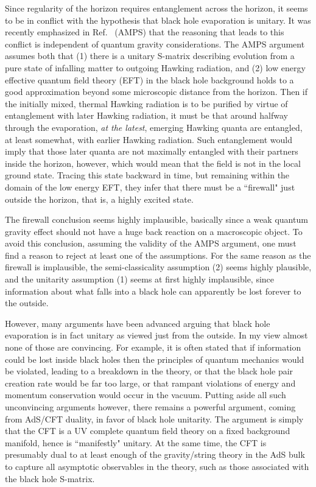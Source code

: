 \documentclass[12pt]{article}
\begin{document}
{Since regularity of the horizon requires entanglement across the horizon, 
it seems to be in conflict with the hypothesis that black hole evaporation 
is unitary.  It was recently emphasized 
in Ref.~\cite{Almheiri:2012rt} (AMPS) that the reasoning that leads to this conflict
is independent of quantum gravity considerations.
The AMPS argument assumes both that (1) there is a unitary S-matrix 
describing evolution from a pure state of infalling matter to outgoing Hawking radiation, and 
(2) low energy effective quantum field theory (EFT) in the black hole background 
holds to a good approximation beyond some microscopic distance from the horizon.
Then if the initially mixed, thermal Hawking radiation is to be purified by virtue of 
entanglement with later Hawking radiation, it must be that around 
halfway through the evaporation, \emph{at the latest}, emerging Hawking quanta are entangled,
at least somewhat, with earlier Hawking radiation. Such entanglement would imply that those
later quanta are not maximally entangled with their partners inside the horizon, however, which
would mean that the field is not in the local ground state. Tracing this state backward
in time, but remaining within the domain of the low energy EFT, they
infer that there must be a ``firewall" just outside the horizon, that is, a highly excited state.

The firewall conclusion seems highly implausible, basically
since a weak quantum gravity effect should not have a
huge back reaction on a macroscopic object. To avoid this
conclusion, assuming the validity of the AMPS argument, 
one must find a reason to reject at least one of the assumptions. 
For the same reason as the firewall is implausible, 
the semi-classicality assumption (2) seems highly plausible,
and the unitarity assumption (1) seems at first highly implausible,
since information about what falls into a black hole can apparently 
be lost forever to the outside. 

However, many arguments have been advanced arguing 
that black hole evaporation is in fact 
unitary as viewed just from the outside. In my view almost
none of those are convincing. For example, it 
is often stated that 
if information could be lost inside black holes then 
the principles of quantum mechanics would be violated, leading to 
a breakdown in the theory, or that 
the black hole pair creation rate would be far too large, or that 
rampant violations of energy and momentum conservation would occur
in the vacuum. Putting aside all such unconvincing arguments however, there 
remains a powerful argument, coming from AdS/CFT duality,
 in favor of black hole unitarity. 
The argument is simply that the CFT is a UV complete quantum field theory
on a fixed background manifold, hence is ``manifestly" unitary. At the same
time, the CFT is presumably dual to at least enough of the gravity/string theory in
the AdS bulk to capture all asymptotic observables in the theory, such as those
associated with the black hole S-matrix.

}
\end{document}
